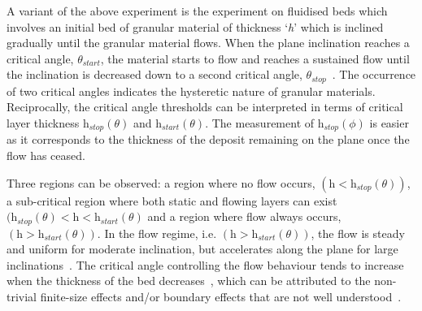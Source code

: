 A variant of the above experiment is the experiment on fluidised beds 
which involves an initial bed of granular material of thickness `\textit{h}' 
which is inclined gradually until the granular material flows. When the plane 
inclination reaches a critical angle, $\theta_{\textit{start}}$, the material 
starts to flow and reaches a sustained flow until the inclination is decreased 
down to a second critical angle, $\theta_{\textit{stop}}$~\citep{Midi2004}. The 
occurrence of two critical angles indicates the hysteretic nature of granular 
materials. Reciprocally, the critical angle thresholds can be interpreted in 
terms of critical layer thickness $\textit{h}_{\textit{stop}}(\theta)$ and 
$\textit{h}_{\textit{start}}(\theta)$. The measurement of  
$\textit{h}_{\textit{stop}}(\phi)$ is easier as it corresponds to the thickness 
of the deposit remaining on the plane once the flow has ceased. 

Three regions can be observed: a region where no flow occurs, 
$(\textit{h}<\textit{h}_{\textit{stop}}(\theta))$, a sub-critical region where 
both static and flowing layers can exist $(\textit{h}_{\textit{stop}}(\theta) < 
\textit{h} < \textit{h}_{\textit{start}}(\theta)$ and a region where flow 
always occurs, $(\textit{h}>\textit{h}_{\textit{start}}(\theta))$. In the flow 
regime, i.e. $(\textit{h}>\textit{h}_{\textit{start}}(\theta))$, the flow is 
steady and uniform for moderate inclination, but accelerates along the plane 
for large inclinations~\citep{Midi2004}. The critical angle controlling the 
flow behaviour tends to increase when the thickness of the bed 
decreases~\citep{Pouliquen2002a,Daerr1999}, which can be attributed to the 
non-trivial finite-size effects and/or boundary effects that are not well 
understood~\citep{Forterre2008}. 

